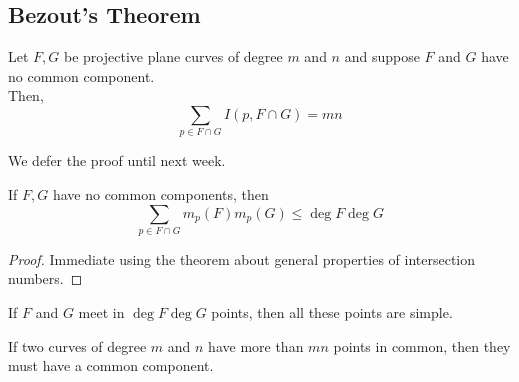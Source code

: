 \documentclass[../main.tex]{subfiles}
\begin{document}
\subsection{Bezout's Theorem}
\begin{thm}[Bezout]
	Let $F,G$ be projective plane curves of degree $m$ and $n$ and suppose $F$ and $G$ have no common component.\\
	Then,
	\[ 
	\sum_{p\in F\cap G} I( p,F\cap G) = mn
	\]
\end{thm}
We defer the proof until next week.
\begin{crly}
If $F,G$ have no common components, then
\[ 
\sum_{p\in F\cap G} m_p( F) m_p( G) \leq \deg F \deg G
\]

\end{crly}
\begin{proof}
Immediate using the theorem about general properties of intersection numbers.
\end{proof}
\begin{crly}
If $F$ and $G$ meet in $\deg F\deg G$ points, then all these points are simple.
\end{crly}
\begin{crly}
If two curves of degree $m$ and $n$ have more than $mn$ points in common, then they must have a common component.
\end{crly}
\end{document}
